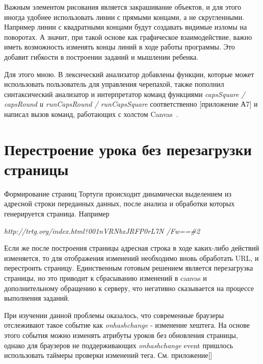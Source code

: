 Важным элементом рисования является закрашивание объектов, и для этого иногда удобнее использовать линии с прямыми концами, а не скругленными. Например линии с квадратными концами будут создавать видимые изломы на поворотах. А значит, при такой основе как графическое взаимодействие, важно иметь возможность  изменять  концы линий в ходе работы программы. Это добавит гибкости в построении заданий и мышлении ребенка.


Для этого мною. В лексический анализатор  добавлены функции, которые может использовать пользователь для управления черепахой, также пополнил синтаксический анализатор и интерпретатор команд функциями \textit{capsSquare / capsRound и runCapsRound / runCapsSquare} соответственно [приложение А7] и написал вызов команд, работающих с холстом Canvas~\cite{tolsh, canvosn}.

\section{Перестроение урока без перезагрузки страницы} \label{sect1_1}


Формирование страниц Тортуги происходит динамически выделением из адресной строки переданных данных, после анализа и обработки которых генерируется страница.
Например 
 
 \begin{center}
 \vspace{6mm}
  \textit{ http://trtg.org/index.html?001nVRNbxJRFP0rL7N /Fw==\#2 }
 \end{center} 
 \vspace{6mm}
 
Если же после построения страницы адресная строка в ходе каких-либо действий изменяется, то для отображения изменений необходимо вновь обработать URL, и  перестроить страницу. Единственным готовым решением является  перезагрузка страницы, но это приводит к сбрасыванию изменений в canvas и дополнительному обращению к серверу, что негативно сказывается на процессе выполнения заданий. 

При изучении данной проблемы оказалось, что современные браузеры отслеживают такое событие как  \textit{onhashchange} - изменение хештега. На основе этого события  можно изменять атрибуты уроков без  обновления страницы, однако для браузеров не поддерживающих \textit{onhashchange} event пришлось использовать таймеры проверки изменений тега. См. приложение[] ~\cite{hash1, hash2, hash3, hash4}

